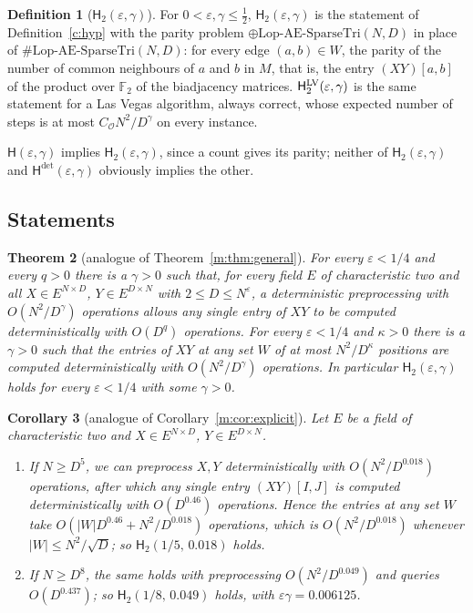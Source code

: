 \documentclass[11pt]{article}
\newtheorem{theorem}{Theorem}[section]
\newtheorem{corollary}[theorem]{Corollary}
\theoremstyle{definition}
\newtheorem{definition}[theorem]{Definition}
\theoremstyle{remark}
\newcommand{\F}{\mathbb{F}_2}
\newcommand{\Lop}{\mathrm{Lop}\text{-}\allowbreak\mathrm{AE}\text{-}\allowbreak\mathrm{SparseTri}}
\newcommand{\Hyp}{\mathsf{H}}
\newcommand{\CharTwoAgamma}{0.018}%
\newcommand{\CharTwoAq}{0.46}%
\newcommand{\CharTwoBgamma}{0.049}%
\newcommand{\CharTwoBq}{0.437}%
\newcommand{\CharTwoEpsGamma}{0.006125}%
\begin{document}
\begin{definition}[$\Hyp_2(\varepsilon,\gamma)$]\label{t:def:hyp}
For $0<\varepsilon,\gamma\le\frac12$, $\Hyp_2(\varepsilon,\gamma)$ is the statement of Definition~\ref{c:hyp} with the parity problem $\oplus\Lop(N,D)$ in place of $\#\Lop(N,D)$: for every edge $(a,b)\in W$, the parity of the number of common neighbours of $a$ and $b$ in $M$, that is, the entry $(XY)[a,b]$ of the product over $\F$ of the biadjacency matrices. $\Hyp_2^{\rm LV}(\varepsilon,\gamma)$ is the same statement for a Las Vegas algorithm, always correct, whose expected number of steps is at most $C_{\mathcal O}N^2/D^\gamma$ on every instance.
\end{definition}

$\Hyp(\varepsilon,\gamma)$ implies $\Hyp_2(\varepsilon,\gamma)$, since a count gives its parity; neither of $\Hyp_2(\varepsilon,\gamma)$ and $\Hyp^{\det}(\varepsilon,\gamma)$ obviously implies the other.

\subsection{Statements}\label{t:sec:statements}

\begin{theorem}[analogue of Theorem~\ref{m:thm:general}]\label{t:thm:general}
For every $\varepsilon<1/4$ and every $q>0$ there is a $\gamma>0$ such that, for every field $E$ of characteristic two and all $X\in E^{N\times D}$, $Y\in E^{D\times N}$ with $2\le D\le N^\varepsilon$, a deterministic preprocessing with $O(N^2/D^\gamma)$ operations allows any single entry of $XY$ to be computed deterministically with $O(D^q)$ operations. For every $\varepsilon<1/4$ and $\kappa>0$ there is a $\gamma>0$ such that the entries of $XY$ at any set $W$ of at most $N^2/D^\kappa$ positions are computed deterministically with $O(N^2/D^\gamma)$ operations. In particular $\Hyp_2(\varepsilon,\gamma)$ holds for every $\varepsilon<1/4$ with some $\gamma>0$.
\end{theorem}

\begin{corollary}[analogue of Corollary~\ref{m:cor:explicit}]\label{t:cor:explicit}
Let $E$ be a field of characteristic two and $X\in E^{N\times D}$, $Y\in E^{D\times N}$.
\begin{enumerate}[label=(\alph*),nosep]
\item If $N\ge D^5$, we can preprocess $X,Y$ deterministically with $O(N^2/D^{\CharTwoAgamma})$ operations, after which any single entry $(XY)[I,J]$ is computed deterministically with $O(D^{\CharTwoAq})$ operations. Hence the entries at any set $W$ take $O(|W|D^{\CharTwoAq}+N^2/D^{\CharTwoAgamma})$ operations, which is $O(N^2/D^{\CharTwoAgamma})$ whenever $|W|\le N^2/\sqrt D$; so $\Hyp_2(1/5,\,\CharTwoAgamma)$ holds.
\item If $N\ge D^8$, the same holds with preprocessing $O(N^2/D^{\CharTwoBgamma})$ and queries $O(D^{\CharTwoBq})$; so $\Hyp_2(1/8,\,\CharTwoBgamma)$ holds, with $\varepsilon\gamma=\CharTwoEpsGamma$.
\end{enumerate}
\end{corollary}
\end{document}
